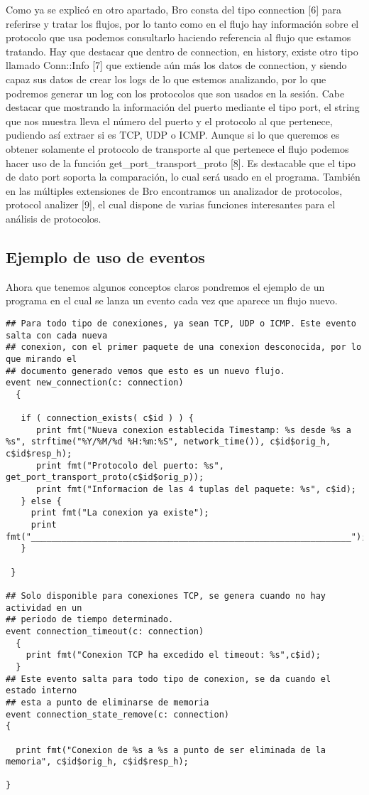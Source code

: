 Como ya se explicó en otro apartado, Bro consta del tipo connection [6] 
para referirse y tratar los flujos, por lo tanto como en el flujo hay 
información sobre el protocolo que usa podemos consultarlo haciendo 
referencia al flujo que estamos tratando. Hay que destacar que dentro 
de connection, en history, existe otro tipo llamado Conn::Info [7] que 
extiende aún más los datos de connection, y siendo capaz sus datos de 
crear los logs de lo que estemos analizando, por lo que podremos generar 
un log con los protocolos que son usados en la sesión. Cabe destacar que 
mostrando la información del puerto mediante el tipo port, el string que 
nos muestra lleva el número del puerto y el protocolo al que pertenece, 
pudiendo así extraer si es TCP, UDP o ICMP. Aunque si lo que queremos es 
obtener solamente el protocolo de transporte al que pertenece el flujo 
podemos hacer uso de la función get\_port\_transport\_proto [8].
\intro
Es destacable que el tipo de dato port soporta la comparación, lo cual 
será usado en el programa.  
\intro
También en las múltiples extensiones de Bro encontramos un analizador 
de protocolos, protocol analizer [9], el cual dispone de varias funciones 
interesantes para el análisis de protocolos.

\subsection{Ejemplo de uso de eventos}

Ahora que tenemos algunos conceptos claros pondremos el ejemplo de un 
programa en el cual se lanza un evento cada vez que aparece un flujo nuevo.
\intro

\begin{lstlisting}[style=CodigoC]
## Para todo tipo de conexiones, ya sean TCP, UDP o ICMP. Este evento salta con cada nueva
## conexion, con el primer paquete de una conexion desconocida, por lo que mirando el
## documento generado vemos que esto es un nuevo flujo.
event new_connection(c: connection)
  {

   if ( connection_exists( c$id ) ) {
      print fmt("Nueva conexion establecida Timestamp: %s desde %s a %s", strftime("%Y/%M/%d %H:%m:%S", network_time()), c$id$orig_h, c$id$resp_h);
      print fmt("Protocolo del puerto: %s", get_port_transport_proto(c$id$orig_p));
      print fmt("Informacion de las 4 tuplas del paquete: %s", c$id);
   } else {
     print fmt("La conexion ya existe");
     print fmt("_______________________________________________________________");
   }

 }

## Solo disponible para conexiones TCP, se genera cuando no hay actividad en un
## periodo de tiempo determinado.
event connection_timeout(c: connection)
  {
    print fmt("Conexion TCP ha excedido el timeout: %s",c$id);
  }
## Este evento salta para todo tipo de conexion, se da cuando el estado interno
## esta a punto de eliminarse de memoria
event connection_state_remove(c: connection)
{

  print fmt("Conexion de %s a %s a punto de ser eliminada de la memoria", c$id$orig_h, c$id$resp_h);

}
\end{lstlisting}

